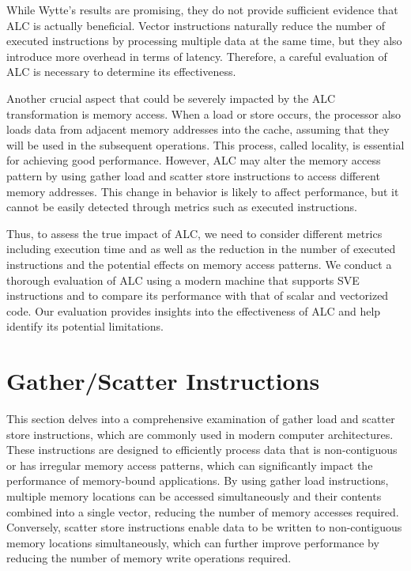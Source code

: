\documentclass[\main/thesis.tex]{subfiles}
\begin{document}
While Wytte's results are promising, they do not provide sufficient evidence that ALC is actually beneficial. Vector instructions naturally reduce the number of executed instructions by processing multiple data at the same time, but they also introduce more overhead in terms of latency. Therefore, a careful evaluation of ALC is necessary to determine its effectiveness.

Another crucial aspect that could be severely impacted by the ALC transformation is memory access. When a load or store occurs, the processor also loads data from adjacent memory addresses into the cache, assuming that they will be used in the subsequent operations. This process, called locality, is essential for achieving good performance. However, ALC may alter the memory access pattern by using gather load and scatter store instructions to access different memory addresses. This change in behavior is likely to affect performance, but it cannot be easily detected through metrics such as executed instructions.

Thus, to assess the true impact of ALC, we need to consider different metrics including execution time and as well as the reduction in the number of executed instructions and the potential effects on memory access patterns. We conduct a thorough evaluation of ALC using a modern machine that supports SVE instructions and to compare its performance with that of scalar and vectorized code. Our evaluation provides insights into the effectiveness of ALC and help identify its potential limitations.




\section{Gather/Scatter Instructions}

This section delves into a comprehensive examination of gather load and scatter store instructions, which are commonly used in modern computer architectures. These instructions are designed to efficiently process data that is non-contiguous or has irregular memory access patterns, which can significantly impact the performance of memory-bound applications. By using gather load instructions, multiple memory locations can be accessed simultaneously and their contents combined into a single vector, reducing the number of memory accesses required. Conversely, scatter store instructions enable data to be written to non-contiguous memory locations simultaneously, which can further improve performance by reducing the number of memory write operations required.
\end{document}
